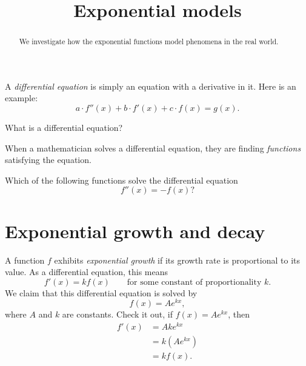 \documentclass{ximera}
\title[Dig-In:]{Exponential models}
\begin{document}
\begin{abstract}
We investigate how the exponential functions model phenomena in the
real world.
\end{abstract}
\maketitle

A \textit{differential equation} is
simply an equation with a derivative in it. Here is an example:
\[
a\cdot f''(x) + b\cdot f'(x) + c\cdot f(x) = g(x). 
\]
\begin{question}
  What is a differential equation?
  \begin{multipleChoice}
  \end{multipleChoice}
\end{question}

When a mathematician solves a differential equation, they are finding
\textit{functions} satisfying the equation.
\begin{question}
  Which of the following functions solve the differential equation
  \[
  f''(x) = -f(x)?
  \]
  \begin{selectAll}
  \end{selectAll}
\end{question}






\section{Exponential growth and decay}

A function $f$ exhibits \textit{exponential growth} if its growth rate is proportional to its value. As a
differential equation, this means
\[
f'(x) = k f(x)\qquad\text{for some constant of proportionality $k$.}
\]
We claim that this differential equation is solved by
\[
f(x) = Ae^{kx},
\]
where $A$ and $k$ are constants.  Check it out, if $f(x) = Ae^{kx}$,
then
\begin{align*}
f'(x) &= Ak e^{kx}\\
&= k\left(Ae^{kx} \right)\\
&= k f(x).
\end{align*}
\end{document}
